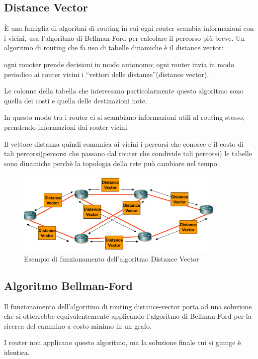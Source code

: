\subsection{Distance Vector}

È una famiglia di algoritmi di routing in cui ogni router scambia informazioni con i vicini, usa l'algoritmo di Bellman-Ford per calcolare il percorso più breve.
Un algoritmo di routing che fa uso di tabelle dinamiche è il distance vector:

ogni rouoter prende decisioni in modo autonomo; ogni router invia in modo periodico ai router vicini i “vettori delle distanze”(distance vector).

Le colonne della tabella che interessano particolarmente questo algoritmo sono quella dei costi e quella delle destinazioni note. 

In questo modo tra i router ci si scambiano informazioni utili al routing stesso, prendendo informazioni dai router vicini

Il vettore distanza quindi comunica ai vicini i percorsi che conosce e il costo di tali percorsi(percorsi che passano dal router che condivide tali percorsi)
le tabelle sono dinamiche perchè la topologia della rete può cambiare nel tempo.

\begin{figure}[h!]
    \centering
    \includegraphics[width=0.9\textwidth]{images/distancevector.png}
    \caption{Esempio di funzionamento dell'algoritmo Distance Vector}
    \label{fig:distancevector}
\end{figure}
\newpage
\subsection{Algoritmo Bellman-Ford}
Il funzionamento dell'algoritmo di routing distance-vector porta ad una
soluzione che si otterrebbe equivalentemente applicando l'algoritmo di
Bellman-Ford per la ricerca del cammino a costo minimo in un grafo.

I router non applicano questo algoritmo, ma la
soluzione finale cui si giunge è identica.

